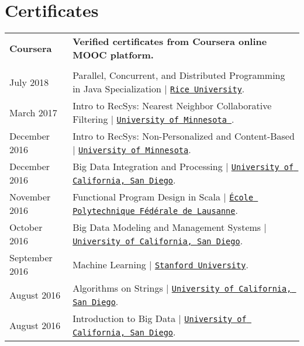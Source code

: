 \documentclass[letterpaper]{article}
\begin{document}
{{{{\section*{Certificates}

{\renewcommand{\arraystretch}{1.2}
\begin{tabular}{l l}
\textbf{Coursera} & \textbf{Verified certificates from Coursera online MOOC platform.}
\\
\\
July 2018 &  Parallel, Concurrent, and Distributed Programming in Java Specialization |  \href{https://www.coursera.org/account/accomplishments/specialization/7XPLLTAAT4TG}{\tt Rice University}.
\\
March 2017 &  Intro to RecSys: Nearest Neighbor Collaborative Filtering                                               |  \href{https://www.coursera.org/account/accomplishments/verify/PZNSF9HR2TS4}{\tt University of Minnesota }.
\\
December 2016 & Intro to RecSys: Non-Personalized and Content-Based  |  \href{https://www.coursera.org/account/accomplishments/verify/DUQNZMH9CU7W}{\tt University of Minnesota}.
\\
December 2016 & Big Data Integration and Processing |  \href{https://www.coursera.org/account/accomplishments/verify/4GGUNARB9MBQ}{\tt University of California, San Diego}.
\\
November 2016 & Functional Program Design in Scala |  \href{https://www.coursera.org/account/accomplishments/certificate/LNSNRHKK4K44}{\tt École Polytechnique Fédérale de Lausanne}.
\\
October 2016 &  Big Data Modeling and Management Systems |  \href{https://www.coursera.org/account/accomplishments/certificate/NDLW93FX3U99}{\tt University of California, San Diego}.
\\
September 2016 & Machine Learning                                                                                                  |  \href{https://www.coursera.org/account/accomplishments/certificate/JE788VNJ6TKS}{\tt Stanford University}.
\\
August 2016 & Algorithms on Strings |  \href{https://www.coursera.org/account/accomplishments/certificate/ZALUCS3TDQTD}{\tt University of California, San Diego}.
\\
August 2016 & Introduction to Big Data                                                               |  \href{https://www.coursera.org/account/accomplishments/certificate/XE3LV3RG2THG}{\tt University of California, San Diego}.

\end{tabular}}}}}}
\end{document}

